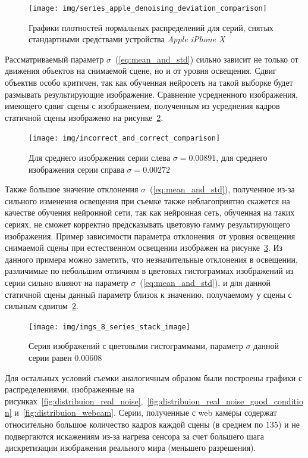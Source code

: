 \begin{figure}[h!]
	\centering
	\texttt{[image: img/series\_apple\_denoising\_deviation\_comparison]}
	\caption{Графики плотностей нормальных распределений для серий, снятых стандартными средствами устройства \textit{Apple iPhone X}}
	\label{fig:distribuion_after_apple_denoising}
\end{figure}


Рассматриваемый параметр $\sigma$~(\ref{eq:mean_and_std}) сильно зависит не только от движения объектов на снимаемой сцене, но и от уровня освещения. Сдвиг объектив особо критичен, так как обученная нейросеть на такой выборке будет размывать результирующие изображение. Сравнение усредненного изображения, имеющего сдвиг сцены с изображением, полученным из усреднения кадров статичной сцены изображено на рисунке~\ref{fig:deviations_comparision}. 

\begin{figure}[H]
	\centering
	\texttt{[image: img/incorrect\_and\_correct\_comparison]}
	\caption{Для среднего изображения серии слева $\sigma = 0.00891$, для среднего изображения серии справа $\sigma = 0.00272$}
	\label{fig:deviations_comparision}
\end{figure}

Также большое значение отклонения $\sigma$~(\ref{eq:mean_and_std}), полученное из-за сильного изменения освещения при съемке также неблагоприятно скажется на качестве обучения нейронной сети, так как нейронная сеть, обученная на таких сериях, не сможет корректно предсказывать цветовую гамму результирующего изображения. Пример зависимости параметра отклонения от уровня освещения снимаемой сцены при естественном освещении изображен на рисунке~\ref{fig:hists_comparision}. Из данного примера  можно заметить, что незначительные отклонения в освещении, различимые по небольшим отличиям в цветовых гистограммах изображений из серии сильно влияют на параметр $\sigma$~(\ref{eq:mean_and_std}), и для данной статичной сцены данный параметр близок к значению, получаемому у сцены с сильным сдвигом~\ref{fig:deviations_comparision}.


\begin{figure}[H]
	\centering
	\texttt{[image: img/imgs\_8\_series\_stack\_image]}
	\caption{Серия изображений с цветовыми гистограммами, параметр $\sigma$ данной серии равен $0.00608$ }
	\label{fig:hists_comparision}
\end{figure}

Для остальных условий съемки аналогичным образом были построены графики с распределениями, изображенные на рисунках~\ref{fig:distribuion_real_noise},~\ref{fig:distribuion_real_noise_good_condition} и~\ref{fig:distribuion_webcam}. Серии, полученные с web камеры содержат относительно большое количество кадров каждой сцены (в среднем по $135$) и не подвергаются искажениям из-за нагрева сенсора за счет большего шага дискретизации изображения реального мира (меньшего разрешения).

